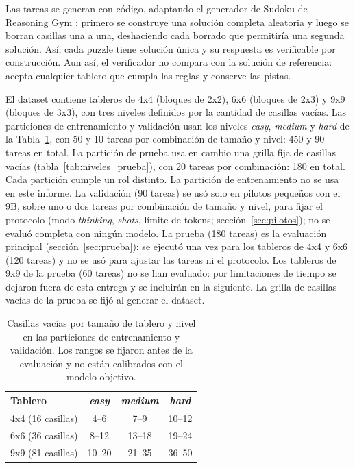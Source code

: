 Las tareas se generan con código, adaptando el generador de Sudoku de
Reasoning Gym \citep{stojanovski2025reasoninggym}: primero se construye
una solución completa aleatoria y luego se borran casillas una a una,
deshaciendo cada borrado que permitiría una segunda solución. Así, cada
puzzle tiene solución única y su respuesta es verificable por
construcción. Aun así, el verificador no compara con la solución de
referencia: acepta cualquier tablero que cumpla las reglas y conserve
las pistas.

El dataset contiene tableros de 4x4 (bloques de 2x2), 6x6 (bloques de
2x3) y 9x9 (bloques de 3x3), con tres niveles definidos por la cantidad
de casillas vacías. Las particiones de entrenamiento y validación usan los
niveles \emph{easy}, \emph{medium} y \emph{hard} de la
Tabla~\ref{tab:niveles}, con 50 y 10 tareas por combinación de tamaño y
nivel: 450 y 90 tareas en total. La partición de prueba usa en cambio una
grilla fija de casillas vacías (tabla~\ref{tab:niveles_prueba}), con 20
tareas por combinación: 180 en total. Cada partición cumple un rol distinto. La
partición de entrenamiento no se usa en este informe. La validación (90
tareas) se usó solo en pilotos pequeños con el 9B, sobre uno o dos tareas por
combinación de tamaño y nivel, para fijar el protocolo (modo \emph{thinking},
\emph{shots}, límite de tokens; sección~\ref{sec:pilotos}); no se evaluó
completa con ningún modelo. La prueba (180 tareas) es la evaluación principal
(sección~\ref{sec:prueba}): se ejecutó una vez para los tableros de 4x4 y
6x6 (120 tareas) y no se usó para ajustar las tareas ni el protocolo. Los
tableros de 9x9 de la prueba (60 tareas) no se han evaluado: por limitaciones de
tiempo se dejaron fuera de esta entrega y se incluirán en la siguiente. La grilla de
casillas vacías de la prueba se fijó al generar el dataset.

\begin{table}[htbp]
  \centering\small
  \caption{Casillas vacías por tamaño de tablero y nivel en las particiones de
  entrenamiento y validación. Los rangos se
  fijaron antes de la evaluación y no están calibrados con el modelo
  objetivo.}
  \label{tab:niveles}
  \begin{tabular}{@{}lccc@{}}
    \toprule
    Tablero & \emph{easy} & \emph{medium} & \emph{hard} \\
    \midrule
    4x4 (16 casillas) & 4--6   & 7--9   & 10--12 \\
    6x6 (36 casillas) & 8--12  & 13--18 & 19--24 \\
    9x9 (81 casillas) & 10--20 & 21--35 & 36--50 \\
    \bottomrule
  \end{tabular}
\end{table}


